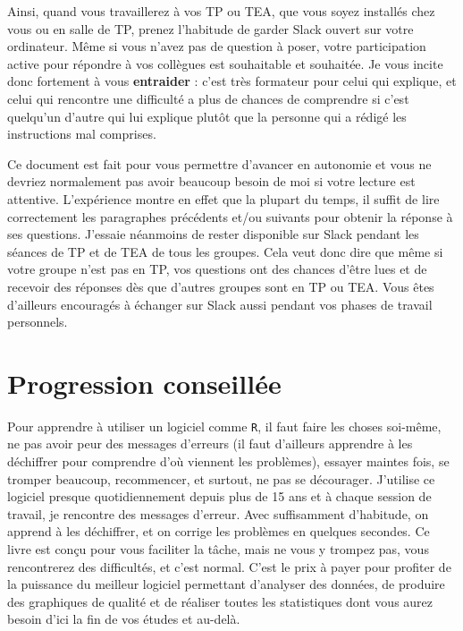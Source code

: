 \documentclass[
  a4paper,
  DIV=11,
  numbers=noendperiod,
  oneside]{scrreprt}
\begin{document}
Ainsi, quand vous travaillerez à vos TP ou TEA, que vous soyez installés
chez vous ou en salle de TP, prenez l'habitude de garder Slack ouvert
sur votre ordinateur. Même si vous n'avez pas de question à poser, votre
participation active pour répondre à vos collègues est souhaitable et
souhaitée. Je vous incite donc fortement à vous \textbf{entraider} :
c'est très formateur pour celui qui explique, et celui qui rencontre une
difficulté a plus de chances de comprendre si c'est quelqu'un d'autre
qui lui explique plutôt que la personne qui a rédigé les instructions
mal comprises.

Ce document est fait pour vous permettre d'avancer en autonomie et vous
ne devriez normalement pas avoir beaucoup besoin de moi si votre lecture
est attentive. L'expérience montre en effet que la plupart du temps, il
suffit de lire correctement les paragraphes précédents et/ou suivants
pour obtenir la réponse à ses questions. J'essaie néanmoins de rester
disponible sur Slack pendant les séances de TP et de TEA de tous les
groupes. Cela veut donc dire que même si votre groupe n'est pas en TP,
vos questions ont des chances d'être lues et de recevoir des réponses
dès que d'autres groupes sont en TP ou TEA. Vous êtes d'ailleurs
encouragés à échanger sur Slack aussi pendant vos phases de travail
personnels.

\section*{Progression conseillée}\label{progression-conseilluxe9e}


Pour apprendre à utiliser un logiciel comme \texttt{R}, il faut faire
les choses soi-même, ne pas avoir peur des messages d'erreurs (il faut
d'ailleurs apprendre à les déchiffrer pour comprendre d'où viennent les
problèmes), essayer maintes fois, se tromper beaucoup, recommencer, et
surtout, ne pas se décourager. J'utilise ce logiciel presque
quotidiennement depuis plus de 15 ans et à chaque session de travail, je
rencontre des messages d'erreur. Avec suffisamment d'habitude, on
apprend à les déchiffrer, et on corrige les problèmes en quelques
secondes. Ce livre est conçu pour vous faciliter la tâche, mais ne vous
y trompez pas, vous rencontrerez des difficultés, et c'est normal. C'est
le prix à payer pour profiter de la puissance du meilleur logiciel
permettant d'analyser des données, de produire des graphiques de qualité
et de réaliser toutes les statistiques dont vous aurez besoin d'ici la
fin de vos études et au-delà.
\end{document}
